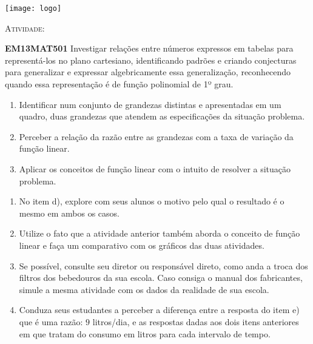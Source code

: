 \documentclass[10 pt,usenames,dvipsnames, oneside]{article}
\begin{document}
\begin{center}
  \begin{minipage}[l]{3cm}
\texttt{[image: logo]}    
\end{minipage}\hfill
\begin{minipage}[r]{.8\textwidth}
 {\Large \scshape Atividade: }  
\end{minipage}
\end{center}
\vspace{.2cm}

\ifdefined\prof
\begin{objetivos}
\item \textbf{EM13MAT501} Investigar relações entre números expressos em tabelas para representá-los no plano cartesiano, identificando padrões e criando conjecturas para generalizar e expressar algebricamente essa generalização, reconhecendo quando essa representação é de função polinomial de 1º grau.
\end{objetivos}

\begin{goals}
\begin{enumerate}
\item Identificar num conjunto de grandezas distintas e apresentadas em um quadro, duas grandezas que atendem as especificações da situação problema.
\item Perceber a relação da razão entre as grandezas com a taxa de variação da função linear.
\item Aplicar os conceitos de função linear com o intuito de resolver a situação problema.
\end{enumerate}

\tcblower
\begin{enumerate}
\item No item d), explore com seus alunos o motivo pelo qual o resultado é o mesmo em ambos os casos.
\item Utilize o fato que a atividade anterior também aborda o conceito de função linear e faça um comparativo com os gráficos das duas atividades.
\item Se possível, consulte seu diretor ou responsável direto, como anda a troca dos filtros dos bebedouros da sua escola. Caso consiga o manual dos fabricantes, simule a mesma atividade com os dados da realidade de sua escola.
\item Conduza seus estudantes a perceber a diferença entre a resposta do item e) que é uma razão: $9$ litros/dia, e as respostas dadas aos dois itens anteriores em que tratam do consumo em litros para cada intervalo de tempo.
\end{enumerate}

\end{goals}
\end{document}
